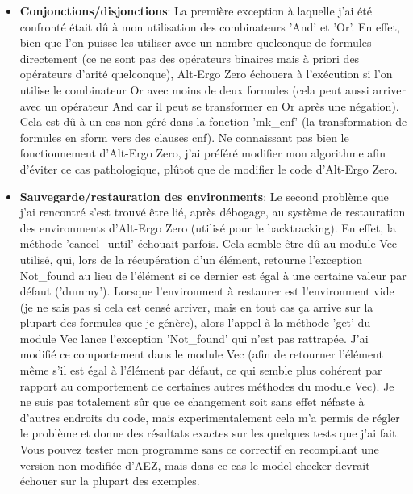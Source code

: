 \documentclass[a4paper]{article}%
\begin{document}
	\begin{itemize}
		\item \textbf{Conjonctions/disjonctions}: La première exception à laquelle j'ai été confronté était dû à mon utilisation des combinateurs
		'And' et 'Or'. En effet, bien que l'on puisse les utiliser avec un nombre quelconque de formules directement
		(ce ne sont pas des opérateurs binaires mais à priori des opérateurs d'arité quelconque),
		Alt-Ergo Zero échouera à l'exécution si l'on utilise le combinateur Or avec moins de deux formules
		(cela peut aussi arriver avec un opérateur And car il peut se transformer en Or après une négation).
		Cela est dû à un cas non géré dans la fonction 'mk\_cnf' (la transformation de formules en sform vers des clauses cnf).
		Ne connaissant pas bien le fonctionnement d'Alt-Ergo Zero, j'ai préféré modifier mon algorithme afin d'éviter ce cas pathologique,
		plûtot que de modifier le code d'Alt-Ergo Zero.\\
		\item \textbf{Sauvegarde/restauration des environments}: Le second problème que j'ai rencontré s'est trouvé être
		lié, après débogage, au système de restauration des environments d'Alt-Ergo Zero (utilisé pour le backtracking).
		En effet, la méthode 'cancel\_until' échouait parfois. Cela semble être dû au module Vec utilisé, qui, lors de la récupération d'un élément,
		retourne l'exception Not\_found au lieu de l'élément si ce dernier est égal à une certaine valeur par défaut ('dummy').
		Lorsque l'environment à restaurer est l'environment vide (je ne sais pas si cela est censé arriver, mais en tout cas ça arrive sur la plupart des formules que je génère),
		alors l'appel à la méthode 'get' du module Vec lance l'exception 'Not\_found' qui n'est pas rattrapée.
		J'ai modifié ce comportement dans le module Vec (afin de retourner l'élément même s'il est égal à l'élément par défaut,
		ce qui semble plus cohérent par rapport au comportement de certaines autres méthodes du module Vec).
		Je ne suis pas totalement sûr que ce changement soit sans effet néfaste à d'autres endroits du code, mais experimentalement cela m'a permis de régler
		le problème et donne des résultats exactes sur les quelques tests que j'ai fait.
		Vous pouvez tester mon programme sans ce correctif en recompilant une version non modifiée d'AEZ, mais dans ce cas le model checker devrait échouer sur la plupart des exemples.
	\end{itemize}
		
\end{document}
